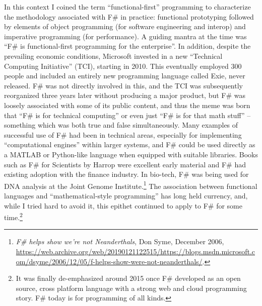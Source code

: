\documentclass[acmsmall,review]{acmart}\settopmatter{printfolios=true,printccs=false,printacmref=false}
\begin{document}
In this context I coined the term “functional-first” programming to characterize the methodology associated with F\# in practice: functional prototyping
followed by elements of object programming (for software engineering and interop) and imperative programming (for performance). A guiding mantra
at the time was “F\# is functional-first programming for the enterprise”.  In addition, despite the prevailing economic conditions, Microsoft invested in a
new “Technical Computing Initiative” (TCI), starting in 2010. This eventually employed 300 people and included an entirely new programming language
called Exie, never released.  F\# was not directly involved in this, and the TCI was subsequently reorganized three years later without producing a major
product, but F\# was loosely associated with some of its public content, and thus the meme was born that “F\# is for technical computing” or even
just “F\# is for that math stuff” – something which was both true and false simultaneously. Many examples of successful use of F\# had been in
technical areas, especially for implementing “computational engines” within larger systems, and F\# could be used directly as a MATLAB or Python-like
language when equipped with suitable libraries.  Books such as F\# for Scientists by Harrop were excellent early material and F\# had existing adoption
with the finance industry. In bio-tech, F\# was being used for DNA analysis at the Joint Genome
Institute.\footnote{\textit{F\# helps show we’re not Neanderthals}, Don Syme, December 2006, \url{https://web.archive.org/web/20190121122515/https://blogs.msdn.microsoft.com/dsyme/2006/12/05/f-helps-show-were-not-neanderthals/}.}  The association between functional languages and
“mathematical-style programming” has long held currency, and, while I tried hard to avoid it, this epithet continued to
apply to F\# for some time.\footnote{It was finally de-emphasized around 2015 once F\# developed as an open source, cross
platform language with a strong web and cloud programming story. F\# today is for programming of all kinds.}
\end{document}
